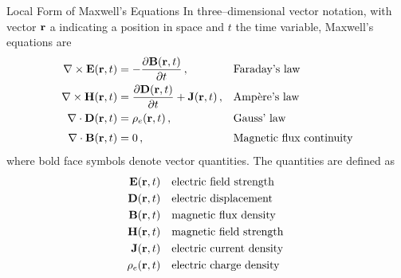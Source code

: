 \documentclass[handout,10pt]{beamer}
\begin{document}
\begin{frame}[shrink=20]{Local Form of Maxwell's Equations}
In three--dimensional vector notation, with vector $\mathbf{r}$ a
indicating a position in space and $t$ the time variable, Maxwell's
equations are   
%
\begin{subequations}
\begin{align}
  \nabla \times {\mathbf{E}}({\mathbf{r}},t) & =
  - {\partial {\mathbf{B}}({\mathbf{r}},t) \over
  \partial t} \, , &&\text{Faraday's law} \label{Faraday} \\
  \nabla \times {\mathbf{H}}({\mathbf{r}},t) & =
  {\partial {\mathbf{D}}({\mathbf{r}},t) \over
  \partial t} + {\mathbf{J}}({\mathbf{r}},t) \, ,
  &&\text{Amp\`ere's law}  \label{Ampere} \\
  \nabla \cdot {\mathbf{D}}({\mathbf{r}},t)  & =
  \rho_e({\mathbf{r}},t) \, , &&\text{Gauss' law}
  \label{Gausse} \\[1mm]
  \nabla \cdot {\mathbf{B}}({\mathbf{r}},t) & =
  0 \, , &&\text{Magnetic flux continuity}
  \label{Gaussm}
\end{align}
\end{subequations}
%
%
where bold face symbols denote vector quantities. The quantities are
defined as
%
\begin{align}
{\mathbf{E}}({\mathbf{r}},t)  \quad &
  \mbox{electric field strength}
 \nonumber \\
{\mathbf{D}}({\mathbf{r}},t) \quad &
  \mbox{electric displacement}
 \nonumber \\
{\mathbf{B}}({\mathbf{r}},t) \quad &
  \mbox{magnetic flux density}
 \nonumber \\
{\mathbf{H}}({\mathbf{r}},t) \quad &
  \mbox{magnetic field strength}
 \nonumber \\
{\mathbf{J}}({\mathbf{r}},t)  \quad &
  \mbox{electric current density }
 \nonumber \\
\rho_e({\mathbf{r}},t) \quad &
  \mbox{electric charge density }
 \nonumber
\end{align}


\end{frame}
\end{document}
